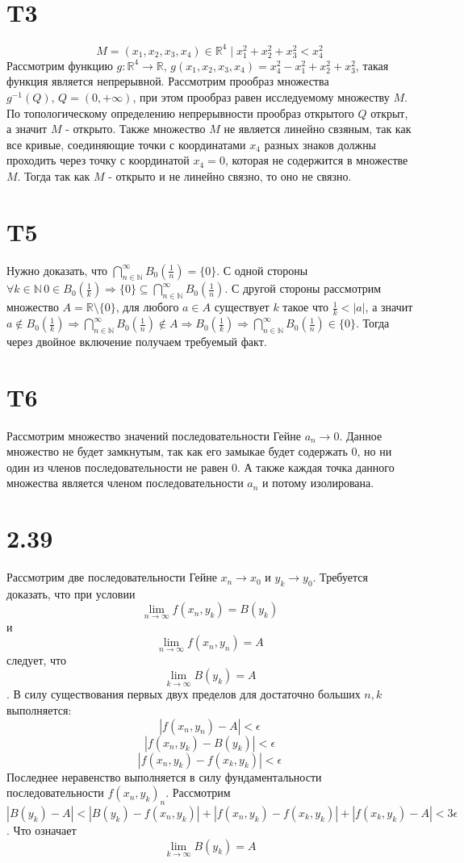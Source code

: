\documentclass[12pt]{article}
\begin{document}
\section{T3}
$$M = {(x_1, x_2, x_3, x_4) \in \mathbb{R}^4 \mid x_1^2 + x_2^2 + x_3^2 < x_4^2}$$
Рассмотрим функцию $g:\mathbb{R}^4 \to \mathbb{R},\, g(x_1, x_2, x_3, x_4) = x_4^2 - x_1^2 + x_2^2 + x_3^2$, такая функция является непрерывной. Рассмотрим прообраз множества
$g^{-1}(Q), \, Q = (0, +\infty)$, при этом прообраз равен исследуемому множеству $M$. По топологическому
определению непрерывности прообраз открытого $Q$ открыт, а значит $M$ - открыто. Также множество $M$ не является линейно свзяным, так как
все кривые, соединяющие точки с координатами $x_4$ разных знаков должны проходить через точку с координатой $x_4 = 0$, которая не содержится в множестве $M$.
Тогда так как $M$ - открыто и не линейно связно, то оно не связно.
\section{T5}
Нужно доказать, что $\bigcap_{n \in \mathbb{N}}^{\infty}B_0\left(\frac{1}{n}\right) = \{0\}$.
С одной стороны $\forall k \in \mathbb{N} \, 0 \in B_0\left(\frac{1}{k}\right) \Rightarrow \{0\} \subseteq \bigcap_{n \in \mathbb{N}}^{\infty}B_0\left(\frac{1}{n}\right)$.
С другой стороны рассмотрим множество $A = \mathbb{R} \setminus \{0\}$, для любого $a \in A$
существует $k$ такое что $\frac{1}{k} < |a|$, а значит $a \not \in B_0\left(\frac{1}{k}\right) \Rightarrow \bigcap_{n \in \mathbb{N}}^{\infty}B_0\left(\frac{1}{n}\right) \not \in A \Rightarrow B_0\left(\frac{1}{k}\right) \Rightarrow \bigcap_{n \in \mathbb{N}}^{\infty}B_0\left(\frac{1}{n}\right) \in \{0\}$. Тогда через двойное включение получаем требуемый факт.
\section{T6}
Рассмотрим множество значений последовательности Гейне $a_n \rightarrow 0$. Данное множество не будет замкнутым, так как
его замыкае будет содержать $0$, но ни один из членов последовательности не равен $0$. А также каждая точка данного множества является членом последовательности $a_n$ и потому изолирована.
\section{2.39}
Рассмотрим две последовательности Гейне $x_n \to x_0$ и $y_k \to y_0$. Требуется доказать, что при условии
$$\lim_{n \to \infty} f(x_n, y_k) = B(y_k)$$ и $$\lim_{n \to \infty} f(x_n, y_n) = A$$ следует, что $$\lim_{k \to \infty} B(y_k) = A$$.
В силу существования первых двух пределов для достаточно больших $n, k$ выполняется:
$$|f(x_n, y_n) - A| < \epsilon$$
$$|f(x_n, y_k) - B(y_k)| < \epsilon$$
$$|f(x_n, y_k) - f(x_k, y_k)| < \epsilon$$
Последнее неравенство выполняется в силу фундаментальности последовательности $f(x_n, y_k)_n$.
Рассмотрим $|B(y_k) - A| < |B(y_k) - f(x_n, y_k)| + |f(x_n, y_k) - f(x_k, y_k)| + |f(x_k, y_k) - A| < 3\epsilon$. Что означает
$$\lim_{k \to \infty} B(y_k) = A$$
\end{document}
